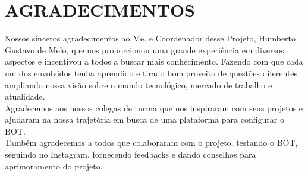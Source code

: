 \noindent\chapter*{\uppercase{Agradecimentos}}

Nossos sinceros agradecimentos ao Me. e Coordenador desse Projeto, Humberto Gustavo de Melo, que nos proporcionou uma grande experiência em diversos aspectos e incentivou a todos a buscar mais conhecimento. Fazendo com que cada um dos envolvidos tenha aprendido e tirado bom proveito de questões diferentes ampliando nossa visão sobre o mundo tecnológico, mercado de trabalho e atualidade. \\

Agradecemos aos nossos colegas de turma que nos inspiraram com seus projetos e ajudaram na nossa trajetória em busca de uma plataforma para configurar o BOT. \\
Também agradecemos a todos que colaboraram com o projeto, testando o BOT, seguindo no Instagram, fornecendo feedbacks e dando conselhos para aprimoramento do projeto.
